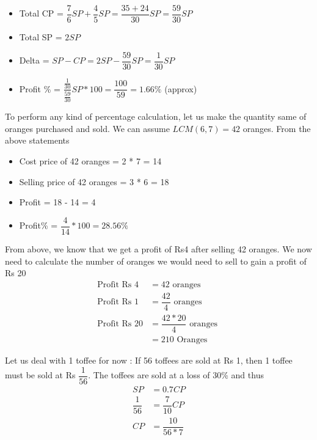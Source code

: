 \begin{itemize}
    \item Total CP = $\dfrac{7}{6}SP + \dfrac{4}{5}SP = \dfrac{35 + 24}{30}SP = \dfrac{59}{30} SP$
    \item Total SP = $2SP$
    \item Delta = $SP - CP = 2SP - \dfrac{59}{30} SP = \dfrac{1}{30}SP$
    \item Profit \% = $\dfrac{\frac{1}{30}}{\frac{59}{30}} SP * 100 = \dfrac{100}{59} = 1.66\%$ (approx)
\end{itemize}


To perform any kind of percentage calculation, let us make the quantity same of oranges purchased and sold. We can assume $LCM(6,7) = 42$ oranges. From the above statements
\begin{itemize}
    \item Cost price of 42 oranges = 2 * 7 = 14
    \item Selling price of 42 oranges = 3 * 6 = 18
    \item Profit = 18 - 14 = 4
    \item Profit\% = $\dfrac{4}{14} * 100 = 28.56\%$
\end{itemize}

From above, we know that we get a profit of Rs4 after selling 42 oranges. We now need to calculate the number of oranges we would need to sell to gain a profit of Rs 20
\begin{align*}
    \text{Profit Rs } 4 &= 42 \text{ oranges } \\
    \text{Profit Rs } 1 &= \dfrac{42}{4} \text{ oranges } \\
    \text{Profit Rs } 20 &= \dfrac{42 * 20}{4} \text{ oranges } \\
    &= 210 \text { Oranges }
\end{align*}


Let us deal with 1 toffee for now : If 56 toffees are sold at Rs 1, then 1 toffee must be sold at Rs $\dfrac{1}{56}$. The toffees are sold at a loss of 30\% and thus
\begin{align*}
    SP &= 0.7CP \\
    \dfrac{1}{56} &= \dfrac{7}{10} CP \\
    CP &= \dfrac{10}{56 * 7}
\end{align*}

